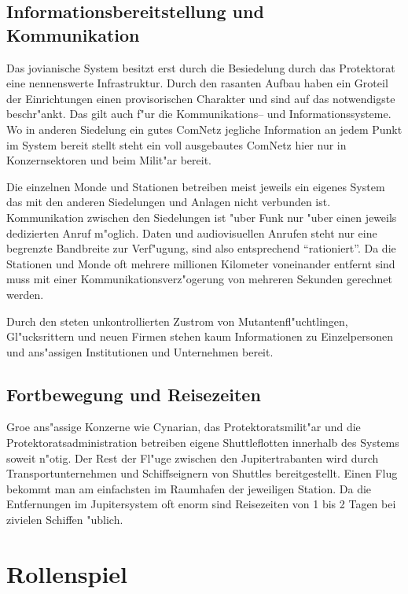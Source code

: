 \subsection{Informationsbereitstellung und Kommunikation}

Das jovianische System besitzt erst durch die Besiedelung durch das Protektorat eine nennenswerte Infrastruktur. Durch den rasanten Aufbau haben ein Gro\3teil der Einrichtungen einen provisorischen Charakter und sind auf das notwendigste beschr"ankt. Das gilt auch f"ur die Kommunikations-- und Informationssysteme. Wo in anderen Siedelung ein gutes ComNetz jegliche Information an jedem Punkt im System bereit stellt steht ein voll ausgebautes ComNetz hier nur in Konzernsektoren und beim Milit"ar bereit.

Die einzelnen Monde und Stationen betreiben meist jeweils ein eigenes System das mit den anderen Siedelungen und Anlagen nicht verbunden ist. Kommunikation zwischen den Siedelungen ist "uber Funk nur "uber einen jeweils dedizierten Anruf m"oglich. Daten und audiovisuellen Anrufen steht nur eine begrenzte Bandbreite zur Verf"ugung, sind also entsprechend ``rationiert''. Da die Stationen und Monde oft mehrere millionen Kilometer voneinander entfernt sind muss mit einer Kommunikationsverz"ogerung von mehreren Sekunden gerechnet werden.

Durch den steten unkontrollierten Zustrom von Mutantenfl"uchtlingen, Gl"ucksrittern und neuen Firmen stehen kaum Informationen zu Einzelpersonen und ans"assigen Institutionen und Unternehmen bereit.

\subsection{Fortbewegung und Reisezeiten}

Gro\3e ans"assige Konzerne wie Cynarian, das Protektoratsmilit"ar und die Protektoratsadministration betreiben eigene Shuttleflotten innerhalb des Systems soweit n"otig. Der Rest der Fl"uge zwischen den Jupitertrabanten wird durch Transportunternehmen und Schiffseignern von Shuttles bereitgestellt. Einen Flug bekommt man am einfachsten im Raumhafen der jeweiligen Station. Da die Entfernungen im Jupitersystem oft enorm sind Reisezeiten von 1 bis 2 Tagen bei zivielen Schiffen "ublich.

\section{Rollenspiel}


